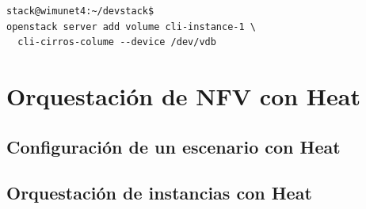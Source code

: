 \begin{lstlisting}[style=Consola]
stack@wimunet4:~/devstack$ 
openstack server add volume cli-instance-1 \
  cli-cirros-colume --device /dev/vdb
\end{lstlisting}





\section{Orquestación de NFV con Heat}
\subsection{Configuración de un escenario con Heat}
\subsection{Orquestación de instancias con Heat}
